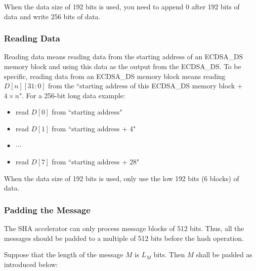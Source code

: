 \documentclass[main\_\_EN.tex]{subfiles}
\begin{document}
\begin{tiplisting}
When the data size of 192 bits is used, you need to append 0 after 192 bits of data and write 256 bits of data.
\end{tiplisting}

\subsubsection{Reading Data}

Reading data means reading data from the starting address of an ECDSA\_DS memory block and using this data as the output from the ECDSA\_DS. To be specific, reading data from an ECDSA\_DS memory block means reading $D[n][31:0]$ from the ``starting address of this ECDSA\_DS memory block + $4 \times n$".
For a 256-bit long data example:
\begin{itemize}
    \item read $D[0]$ from ``starting address"
    \item read $D[1]$ from ``starting address + 4"
    \item $\cdots$
    \item read $D[7]$ from ``starting address + 28"
\end{itemize}

\begin{tiplisting}
When the data size of 192 bits is used, only use the low 192 bits (6 blocks) of data.
\end{tiplisting}

\subsubsection{Padding the Message}\label{sec:ecdsa-msg-padding}

The SHA accelerator can only process message blocks of 512 bits. Thus, all the messages should be padded to a multiple of 512 bits before the hash operation.

Suppose that the length of the message \begin{math}M\end{math} is \begin{math} L_M \end{math} bits. Then \begin{math} M \end{math} shall be padded as introduced below:
\end{document}
